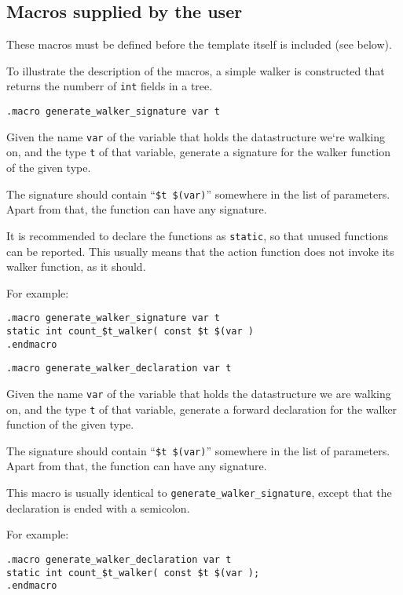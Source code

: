 \subsection{Macros supplied by the user}
These macros must be defined before the template itself is included
(see below).
\par
To illustrate the description of the macros, a simple walker is
constructed that returns the numberr of {\tt int} fields in a tree.
\begin{verbatim}
.macro generate_walker_signature var t
\end{verbatim}
\begin{desc}
Given the name \verb'var' of the variable that holds the datastructure
we`re walking on, and the type \verb't' of that variable, generate a
signature for the walker function of the given type.
\par
The signature should contain ``\verb'$t $(var)''' somewhere in the list
of parameters. Apart from that, the function can have any signature.
\par
It is recommended to declare the functions as \verb'static', so that
unused functions can be reported. This usually means that the
action function does not invoke its walker function, as it should.
\par
For example:
\begin{verbatim}
.macro generate_walker_signature var t
static int count_$t_walker( const $t $(var )
.endmacro
\end{verbatim}
\end{desc}
\begin{verbatim}
.macro generate_walker_declaration var t
\end{verbatim}
\begin{desc}
Given the name \verb'var' of the variable that holds the datastructure
we are walking on, and the type \verb't' of that variable, generate a forward
declaration for the walker function of the given type.
\par
The signature should contain ``\verb'$t $(var)''' somewhere in the list
of parameters. Apart from that, the function can have any signature.
\par
This macro is usually identical to \verb'generate_walker_signature',
except that the declaration is ended with a semicolon.
\par
For example:
\begin{verbatim}
.macro generate_walker_declaration var t
static int count_$t_walker( const $t $(var );
.endmacro
\end{verbatim}
\end{desc}
